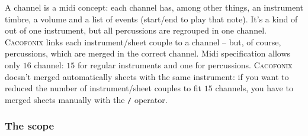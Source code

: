 \documentclass{article}
\newcommand\cacofonix{\textsc{Cacofonix}\xspace}
\begin{document}
A channel is a midi concept: each channel has, among other things, an instrument timbre, a volume and a list of events (start/end to play that note). It's a kind of out of one instrument, but all percussions are regrouped in one channel. \cacofonix links each instrument/sheet couple to a channel -- but, of course, percussions, which are merged in the correct channel. Midi specification allows only $16$ channel: $15$ for regular instruments and one for percussions. \cacofonix doesn't merged automatically sheets with the same instrument: if you want to reduced the number of instrument/sheet couples to fit $15$ channels, you have to merged sheets manually with the \lstinline!/! operator.

\subsubsection{The scope}
\label{sec:scope}
\end{document}
